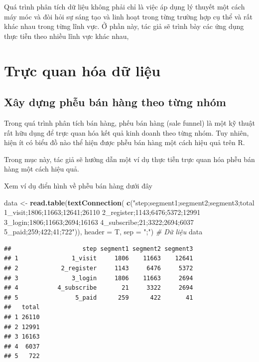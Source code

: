 \documentclass[]{krantz}
\makeatletter
\newenvironment{Shaded}{\begin{snugshade}}{\end{snugshade}}
\newcommand{\CommentTok}[1]{\textcolor[rgb]{0.37,0.37,0.37}{\textit{#1}}}
\newcommand{\DataTypeTok}[1]{\textcolor[rgb]{0.27,0.27,0.27}{#1}}
\newcommand{\KeywordTok}[1]{\textcolor[rgb]{0.27,0.27,0.27}{\textbf{#1}}}
\newcommand{\NormalTok}[1]{#1}
\newcommand{\StringTok}[1]{\textcolor[rgb]{0.5,0.5,0.5}{#1}}
\newenvironment{kframe}{%
\medskip{}
\setlength{\fboxsep}{.8em}
 \def\at@end@of@kframe{}%
 \ifinner\ifhmode%
  \def\at@end@of@kframe{\end{minipage}}%
  \begin{minipage}{\columnwidth}%
 \fi\fi%
 \def\FrameCommand##1{\hskip\@totalleftmargin \hskip-\fboxsep
 \colorbox{shadecolor}{##1}\hskip-\fboxsep
     \hskip-\linewidth \hskip-\@totalleftmargin \hskip\columnwidth}%
 \MakeFramed {\advance\hsize-\width
   \@totalleftmargin\z@ \linewidth\hsize
   \@setminipage}}%
 {\par\unskip\endMakeFramed%
 \at@end@of@kframe}
\renewenvironment{Shaded}{\begin{kframe}}{\end{kframe}}
\renewenvironment{Shaded}{\begin{snugshade}}{\end{snugshade}}
\renewcommand{\CommentTok}[1]{\textcolor[rgb]{0.56,0.35,0.01}{\textit{#1}}}
\renewcommand{\DataTypeTok}[1]{\textcolor[rgb]{0.13,0.29,0.53}{#1}}
\renewcommand{\KeywordTok}[1]{\textcolor[rgb]{0.13,0.29,0.53}{\textbf{#1}}}
\renewcommand{\NormalTok}[1]{#1}
\renewcommand{\StringTok}[1]{\textcolor[rgb]{0.31,0.60,0.02}{#1}}
\theoremstyle{definition}
\theoremstyle{definition}
\theoremstyle{definition}
\theoremstyle{remark}
\makeatother
\begin{document}
Quá trình phân tích dữ liệu không phải chỉ là việc áp dụng lý thuyết một
cách máy móc và đòi hỏi sự sáng tạo và linh hoạt trong từng trường hợp
cụ thể và rất khác nhau trong từng lĩnh vực. Ở phần này, tác giả sẽ
trình bày các ứng dụng thực tiễn theo nhiều lĩnh vực khác nhau,

\hypertarget{trc-quan-hoa-d-liu}{%
\chapter{Trực quan hóa dữ liệu}\label{trc-quan-hoa-d-liu}}

\hypertarget{xay-dng-phu-ban-hang-theo-tng-nhom}{%
\section{Xây dựng phễu bán hàng theo từng
nhóm}\label{xay-dng-phu-ban-hang-theo-tng-nhom}}

Trong quá trình phân tích bán hàng, phếu bán hàng (sale funnel) là một
kỹ thuật rất hữu dụng để trực quan hóa kết quả kinh doanh theo từng
nhóm. Tuy nhiên, hiện ít có biểu đồ nào thể hiện được phễu bán hàng một
cách hiệu quả trên R.

Trong mục này, tác giả sẽ hướng dẫn một ví dụ thực tiễn trực quan hóa
phễu bán hàng một cách hiệu quả.

Xem ví dụ điển hình về phễu bán hàng dưới đây

\begin{Shaded}
\begin{Highlighting}[]
\NormalTok{data <-}\StringTok{ }\KeywordTok{read.table}\NormalTok{(}\KeywordTok{textConnection}\NormalTok{(}
          \KeywordTok{c}\NormalTok{(}\StringTok{"step;segment1;segment2;segment3;total}
\StringTok{          1_visit;1806;11663;12641;26110}
\StringTok{          2_register;1143;6476;5372;12991}
\StringTok{          3_login;1806;11663;2694;16163}
\StringTok{          4_subscribe;21;3322;2694;6037}
\StringTok{          5_paid;259;422;41;722"}\NormalTok{)),}
        \DataTypeTok{header =}\NormalTok{ T, }\DataTypeTok{sep =} \StringTok{";"}\NormalTok{)}
\CommentTok{# Dữ liệu}
\NormalTok{data}
\end{Highlighting}
\end{Shaded}

\begin{verbatim}
##                    step segment1 segment2 segment3
## 1               1_visit     1806    11663    12641
## 2            2_register     1143     6476     5372
## 3               3_login     1806    11663     2694
## 4           4_subscribe       21     3322     2694
## 5                5_paid      259      422       41
##   total
## 1 26110
## 2 12991
## 3 16163
## 4  6037
## 5   722
\end{verbatim}
\end{document}
